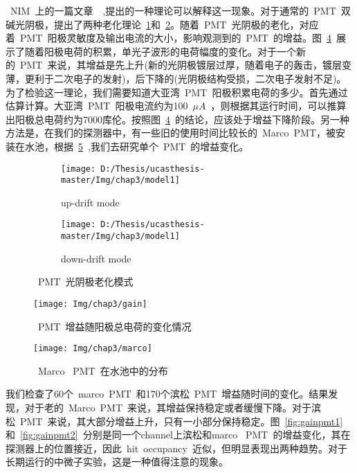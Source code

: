 ~NIM~上的一篇文章~\citep{aiello2013aging}~,提出的一种理论可以解释这一现象。对于通常的~PMT~双碱光阴极，提出了两种老化理论~\ref{fig:model_1}和~\ref{fig:model_2}。随着~PMT~光阴极的老化，对应着~PMT~阳极灵敏度及输出电流的大小，影响观测到的~PMT~的增益。图~\ref{fig:gain}~展示了随着阳极电荷的积累，单光子波形的电荷幅度的变化。对于一个新的~PMT~来说，其增益是先上升(新的光阴极镀层过厚，随着电子的轰击，镀层变薄，更利于二次电子的发射)，后下降的(光阴极结构受损，二次电子发射不足)。为了检验这一理论，我们需要知道大亚湾~PMT~阳极积累电荷的多少。首先通过估算计算。大亚湾~PMT~阳极电流约为100~$\mu A$~，则根据其运行时间，可以推算出阳极总电荷约为7000库伦。按照图~\ref{fig:gain}~的结论，应该处于增益下降阶段。另一种方法是，在我们的探测器中，有一些旧的使用时间比较长的~Marco~PMT，被安装在水池，根据~\ref{fig:marco}~,我们去研究单个~PMT~的增益变化。
\begin{figure}[!htbp]
  \centering
  \begin{subfigure}[b]{\MySubFactor\textwidth}
    \texttt{[image: D:/Thesis/ucasthesis-master/Img/chap3/model1]}
    \caption{up-drift mode}
    \label{fig:model_1}
  \end{subfigure}%
  \quad\quad\quad\quad%
  \begin{subfigure}[b]{\MySubFactor\textwidth}
    \texttt{[image: D:/Thesis/ucasthesis-master/Img/chap3/model1]}
    \caption{down-drift mode}
    \label{fig:model_2}
  \end{subfigure}
\caption{~PMT~光阴极老化模式}
  \label{fig:model}
\end{figure}



\begin{figure}[!htbp]
  \centering
   \texttt{[image: Img/chap3/gain]}
    \caption{ ~PMT~增益随阳极总电荷的变化情况}
  \label{fig:gain}
\end{figure}


\begin{figure}[!htbp]
  \centering
   \texttt{[image: Img/chap3/marco]}
    \caption{~Marco ~PMT~在水池中的分布}
  \label{fig:marco}
\end{figure}



我们检查了60个~marco~PMT~和170个滨松~PMT~增益随时间的变化。结果发现，对于老的~Marco~PMT~来说，其增益保持稳定或者缓慢下降。对于滨松~PMT~来说，其大部分增益上升，只有一小部分保持稳定。图~\ref{fig:gainpmt1}~ 和~\ref{fig:gainpmt2}~分别是同一个channel上滨松和marco ~PMT~的增益变化，其在探测器上的位置接近，因此~hit~occupancy~近似，但明显表现出两种趋势。对于长期运行的中微子实验，这是一种值得注意的现象。


